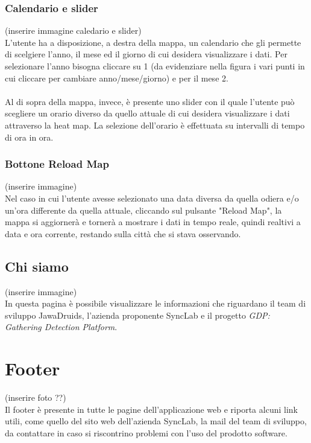 \subsubsection{Calendario e slider}\label{UtilizzoDiGDPGatheringDetecionPlatformContenutoCentralePaginaInizialeHomeCalendarioESlider}
(inserire immagine caledario e slider) \\
L'utente ha a disposizione, a destra della mappa, un calendario che gli permette di scelgiere l'anno, il mese ed il giorno di cui desidera visualizzare i dati. Per selezionare l'anno bisogna cliccare su 1 (da evidenziare nella figura i vari punti in cui cliccare per cambiare anno/mese/giorno) e per il mese 2. \\
\\
Al di sopra della mappa, invece, è presente uno slider con il quale l'utente può scegliere un orario diverso da quello attuale di cui desidera visualizzare i dati attraverso la heat map. La selezione dell'orario è effettuata su intervalli di tempo di ora in ora. 

\subsubsection{Bottone Reload Map} \label{UtilizzoDiGDPGatheringDetecionPlatformContenutoCentralePaginaInizialeHomeBottoneReloadMap}
(inserire immagine)\\
Nel caso in cui l'utente avesse selezionato una data diversa da quella odiera e/o un'ora differente da quella attuale, cliccando sul pulsante "Reload Map", la mappa si aggiornerà e tornerà a mostrare i dati in tempo reale, quindi realtivi a data e ora corrente, restando sulla città che si stava osservando. 

\subsection{Chi siamo} \label{UtilizzoDiGDPGatheringDetecionPlatformContenutoCentraleChiSiamo}
(inserire immagine)\\
In questa pagina è possibile visualizzare le informazioni che riguardano il team di sviluppo JawaDruids, l'azienda proponente SyncLab e il progetto \textit{GDP: Gathering Detection Platform}. 

\section{Footer}\label{UtilizzoDiGDPGatheringDetecionPlatformFooter}
(inserire foto ??) \\
Il footer è presente in tutte le pagine dell'applicazione web e riporta alcuni link utili, come quello del sito web dell'azienda SyncLab, la mail del team di sviluppo, da contattare in caso si riscontrino problemi con l'uso del prodotto software. 



